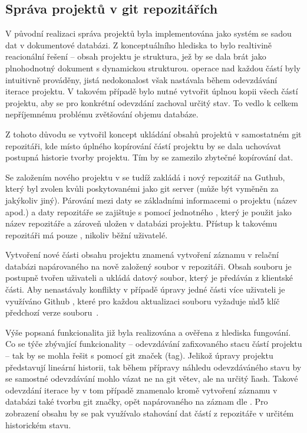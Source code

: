 


\subsection{Správa projektů v git repozitářích}\label{subsec:server-db-github}

V původní realizaci  správa projektů byla implementována jako systém se sadou dat v dokumentové databázi.
Z konceptuálního hlediska to bylo realtivině reacionální řešení – obsah projektu je  struktura, jež by se dala brát jako plnohodnotný dokument s dynamickou strukturou.
 operace nad každou částí byly intuitivně prováděny, jistá nedokonalost však nastávala během odevzdávání iterace projektu.
V takovém případě bylo nutné vytvořit úplnou kopii všech částí projektu, aby se pro konkrétní odevzdání zachoval určitý stav.
To vedlo k celkem nepříjemnému problému zvětšování objemu databáze.

Z tohoto důvodu se vytvořil koncept ukládání obsahů projektů v samostatném git repozitáři, kde místo úplného kopírování částí projektu by se dala uchovávat postupná historie tvorby projektu.
Tím by se zamezilo zbytečné kopírování dat.

Se založením nového projektu v  se tudíž zakládá i nový repozitář na Guthub, který byl zvolen kvůli poskytovanémi  jako git server (může být vyměněn za jakýkoliv jiný).
Párování mezi daty se základními informacemi o projektu (název apod.) a daty repozitáře se zajištuje s pomocí jednotného , který je použit jako název repozitáře a zároveň uložen v databázi projektu.
Přístup k takovému repozitáři má pouze , nikoliv běžní uživatelé.

Vytvoření nové části obsahu projektu znamená vytvoření záznamu v relační databázi napárovaného na nově založený soubor v repozitáři.
Obsah souboru je postupně tvořen uživateli a ukládá datový  soubor, který je předáván z klientské části.
Aby nenastávaly konflikty v případě úpravy jedné části více uživateli je využíváno Github , které pro každou aktualizaci souboru vyžaduje \h{md5} klíč předchozí verze souboru~\cite{githubupdate}.

Výše popsaná funkcionalita již byla realizována a ověřena z hlediska fungování.
Co se týče zbývající funkcionality – odevzdávání zafixovaného stacu částí projektu – tak by se mohla řešit s pomocí git značek (\h{tag}).
Jelikož úpravy projektu představují lineární historii, tak během přípravy náhledu odevzdáváného stavu by se samostné odevzdávání mohlo vázat ne na git větev, ale na určitý \h{hash}.
Takové odevzdání iterace by v tom případě znamenalo kromě vytvoření záznamu v databázi také tvorbu git značky, opět napárovaného na záznam dle .
Pro zobrazení obsahu by se pak využívalo stahování dat částí z repozitáře v určitém historickém stavu.
